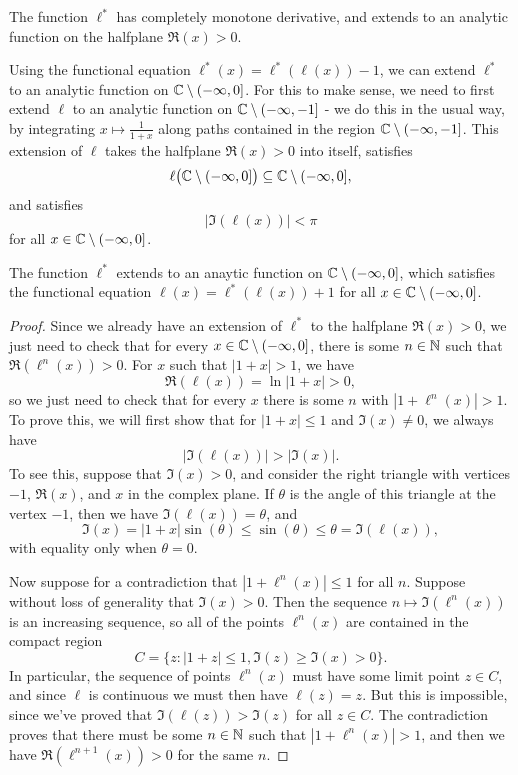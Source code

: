 \documentclass[letterpaper,11pt]{article}
\begin{document}
\begin{cor} The function $\ell^*$ has completely monotone derivative, and extends to an analytic function on the halfplane $\Re(x) > 0$.
\end{cor}

Using the functional equation $\ell^*(x) = \ell^*(\ell(x)) - 1$, we can extend $\ell^*$ to an analytic function on $\mathbb{C} \setminus (-\infty,0]$. For this to make sense, we need to first extend $\ell$ to an analytic function on $\mathbb{C}\setminus(-\infty,-1]$ - we do this in the usual way, by integrating $x \mapsto \frac{1}{1+x}$ along paths contained in the region $\mathbb{C}\setminus(-\infty,-1]$. This extension of $\ell$ takes the halfplane $\Re(x) > 0$ into itself, satisfies
\[
\ell\big(\mathbb{C} \setminus (-\infty,0]\big) \subseteq \mathbb{C} \setminus (-\infty,0],
\]
and satisfies
\[
|\Im(\ell(x))| < \pi
\]
for all $x \in \mathbb{C} \setminus (-\infty,0]$.

\begin{prop} The function $\ell^*$ extends to an anaytic function on $\mathbb{C} \setminus (-\infty,0]$, which satisfies the functional equation $\ell(x) = \ell^*(\ell(x)) + 1$ for all $x \in \mathbb{C} \setminus (-\infty,0]$.
\end{prop}
\begin{proof} Since we already have an extension of $\ell^*$ to the halfplane $\Re(x) > 0$, we just need to check that for every $x \in \mathbb{C}\setminus(-\infty,0]$, there is some $n \in \mathbb{N}$ such that $\Re(\ell^n(x)) > 0$. For $x$ such that $|1+x| > 1$, we have
\[
\Re(\ell(x)) = \ln|1+x| > 0,
\]
so we just need to check that for every $x$ there is some $n$ with $|1+\ell^n(x)| > 1$. To prove this, we will first show that for $|1 + x| \le 1$ and $\Im(x) \ne 0$, we always have
\[
|\Im(\ell(x))| > |\Im(x)|.
\]
To see this, suppose that $\Im(x) > 0$, and consider the right triangle with vertices $-1$, $\Re(x)$, and $x$ in the complex plane. If $\theta$ is the angle of this triangle at the vertex $-1$, then we have $\Im(\ell(x)) = \theta$, and
\[
\Im(x) = |1+x|\sin(\theta) \le \sin(\theta) \le \theta = \Im(\ell(x)),
\]
with equality only when $\theta = 0$.

Now suppose for a contradiction that $|1 + \ell^n(x)| \le 1$ for all $n$. Suppose without loss of generality that $\Im(x) > 0$. Then the sequence $n \mapsto \Im(\ell^n(x))$ is an increasing sequence, so all of the points $\ell^n(x)$ are contained in the compact region
\[
C = \{z : |1+z| \le 1, \Im(z) \ge \Im(x) > 0\}.
\]
In particular, the sequence of points $\ell^n(x)$ must have some limit point $z \in C$, and since $\ell$ is continuous we must then have $\ell(z) = z$. But this is impossible, since we've proved that $\Im(\ell(z)) > \Im(z)$ for all $z \in C$. The contradiction proves that there must be some $n \in \mathbb{N}$ such that $|1+\ell^n(x)| > 1$, and then we have $\Re(\ell^{n+1}(x)) > 0$ for the same $n$.
\end{proof}
\end{document}
